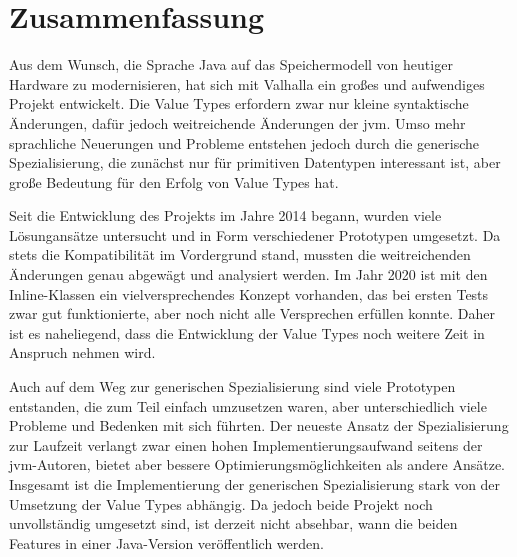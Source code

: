 \section{Zusammenfassung}\label{sec:summary}

Aus dem Wunsch, die Sprache Java auf das Speichermodell von heutiger Hardware zu modernisieren, hat sich mit Valhalla ein großes und aufwendiges Projekt entwickelt.
Die Value Types erfordern zwar nur kleine syntaktische Änderungen, dafür jedoch weitreichende Änderungen der \ac{jvm}.
Umso mehr sprachliche Neuerungen und Probleme entstehen jedoch durch die generische Spezialisierung, die zunächst nur für primitiven Datentypen interessant ist, aber große Bedeutung für den Erfolg von Value Types hat.

Seit die Entwicklung des Projekts im Jahre 2014 begann, wurden viele Lösungansätze untersucht und in Form verschiedener Prototypen umgesetzt.
Da stets die Kompatibilität im Vordergrund stand, mussten die weitreichenden Änderungen genau abgewägt und analysiert werden.
Im Jahr 2020 ist mit den Inline-Klassen ein vielversprechendes Konzept vorhanden, das bei ersten Tests zwar gut funktionierte, aber noch nicht alle Versprechen erfüllen konnte.
Daher ist es naheliegend, dass die Entwicklung der Value Types noch weitere Zeit in Anspruch nehmen wird.

Auch auf dem Weg zur generischen Spezialisierung sind viele Prototypen entstanden, die zum Teil einfach umzusetzen waren, aber unterschiedlich viele Probleme und Bedenken mit sich führten.
Der neueste Ansatz der Spezialisierung zur Laufzeit verlangt zwar einen hohen Implementierungsaufwand seitens der \ac{jvm}-Autoren, bietet aber bessere Optimierungsmöglichkeiten als andere Ansätze.
Insgesamt ist die Implementierung der generischen Spezialisierung stark von der Umsetzung der Value Types abhängig.
Da jedoch beide Projekt noch unvollständig umgesetzt sind, ist derzeit nicht absehbar, wann die beiden Features in einer Java-Version veröffentlich werden.
